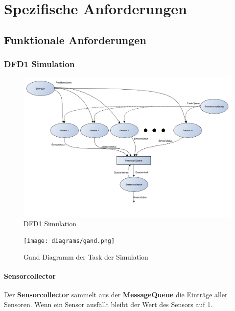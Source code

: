 \section{Spezifische Anforderungen}
\subsection{Funktionale Anforderungen}
\subsubsection{DFD1 Simulation}
\begin{figure}[H]
	\centering
  \includegraphics[width=\textwidth]{DFD/dfd1_simulation1_1.png}
	\caption{DFD1 Simulation}
	\label{fig1}
\end{figure}
\begin{figure}[H]
	\centering
  \texttt{[image: diagrams/gand.png]}
	\caption{Gand Diagramm der Task der Simulation}
	\label{gand}
\end{figure}
\paragraph{Sensorcollector}
Der \textbf{Sensorcollector} sammelt aus der \textbf{MessageQueue} die Einträge aller Sensoren. Wenn ein Sensor ausfällt bleibt der Wert des Sensors auf 1.